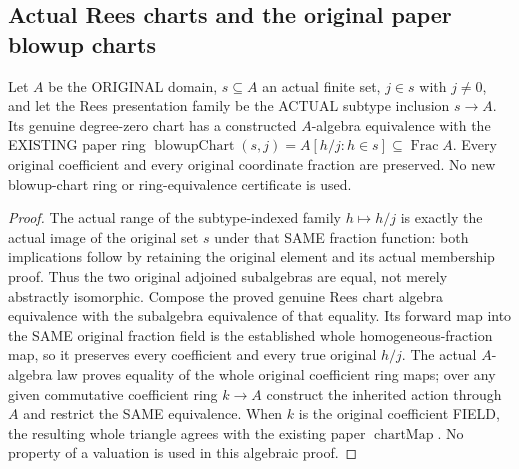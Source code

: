 \subsection{Actual Rees charts and the original paper blowup charts}

\begin{theorem}
\label{paper:actual-rees-original-blowup-chart}
\leanok
Let $A$ be the ORIGINAL domain, $s\subseteq A$ an actual finite set,
$j\in s$ with $j\ne0$, and let the Rees presentation family be the
ACTUAL subtype inclusion $s\to A$. Its genuine degree-zero chart has a
constructed $A$-algebra equivalence with the EXISTING paper ring
$\operatorname{blowupChart}(s,j)=A[h/j:h\in s]\subseteq\operatorname{Frac}A$.
Every original coefficient and every original coordinate fraction are
preserved. No new blowup-chart ring or ring-equivalence certificate is used.
\end{theorem}
\begin{proof}
The actual range of the subtype-indexed family $h\mapsto h/j$ is exactly
the actual image of the original set $s$ under that SAME fraction function:
both implications follow by retaining the original element and its actual
membership proof. Thus the two original adjoined subalgebras are equal,
not merely abstractly isomorphic. Compose the proved genuine Rees chart
algebra equivalence with the subalgebra equivalence of that equality.
Its forward map into the SAME original fraction field is the established
whole homogeneous-fraction map, so it preserves every coefficient and every
true original $h/j$. The actual $A$-algebra law proves equality of the whole
original coefficient ring maps; over any given commutative coefficient ring $k\to A$
construct the inherited action through $A$ and restrict the SAME equivalence.
When $k$ is the original coefficient FIELD, the resulting whole triangle
agrees with the existing paper $\operatorname{chartMap}$.
No property of a valuation is used in this algebraic proof.
\end{proof}


